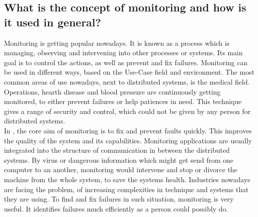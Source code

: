 \subsection{What is the concept of monitoring and how is it used in general?}
\label{subsec:ConceptMonitoring}

Monitoring is getting popular nowadays. It is known as a process which is managing, observing and intervening into other processes or systems.\cite{Jammes2012} Its main goal is to control the actions, as well as prevent and fix failures.\cite{Dinu2011} Monitoring can be used in different ways, based on the Use-Case field and environment.\cite{Dinu2011} The most common areas of use nowadays, next to distributed systems,\cite{Jammes2012} is the medical field. Operations, hearth disease and blood pressure are continuously getting monitored, to either prevent failures or help patiences in need. This technique gives a range of security and control, which could not be given by any person for distributed systems.\cite{Jammes2012}
\\
 In \isds, the core aim of monitoring is to fix and prevent faults quickly. This improves the quality of the system and its capabilities. Monitoring applications are usually integrated into the structure of communication in between the distributed systems.\cite{Jammes2012} By virus or dangerous information which might get send from one computer to an another, monitoring would intervene and stop or divorce the machine from the whole system, to save the systems health. Industries nowadays are facing the problem, of increasing complexities in technique and systems that they are using.\cite{Jammes2012} To find and fix failures in such situation, monitoring is very useful. It identifies failures much efficiently as a person could possibly do.\cite{Jammes2012}
 
